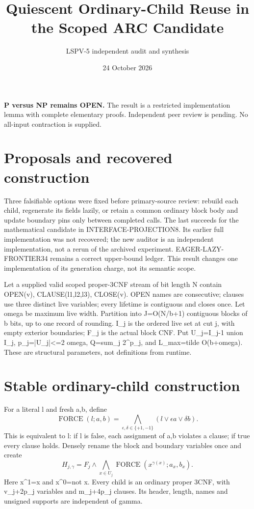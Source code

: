 \documentclass[11pt]{article}
\title{Quiescent Ordinary-Child Reuse in the Scoped ARC Candidate}
\author{LSPV-5 independent audit and synthesis}
\date{24 October 2026}
\begin{document}
\maketitle
\noindent\textbf{P versus NP remains OPEN.} The result is a restricted implementation lemma with complete elementary proofs. Independent peer review is pending. No all-input contraction is supplied.

\section{Proposals and recovered construction}
Three falsifiable options were fixed before primary-source review: rebuild each child, regenerate its fields lazily, or retain a common ordinary block body and update boundary pins only between completed calls. The last succeeds for the mathematical candidate in INTERFACE-PROJECTION8. Its earlier full implementation was not recovered; the new auditor is an independent implementation, not a rerun of the archived experiment. EAGER-LAZY-FRONTIER34 remains a correct upper-bound ledger. This result changes one implementation of its generation charge, not its semantic scope.

Let a supplied valid scoped proper-3CNF stream of bit length N contain OPEN(v), CLAUSE(l1,l2,l3), CLOSE(v). OPEN names are consecutive; clauses use three distinct live variables; every lifetime is contiguous and closes once. Let omega be maximum live width. Partition into J=O(N/b+1) contiguous blocks of b bits, up to one record of rounding. I_j is the ordered live set at cut j, with empty exterior boundaries; F_j is the actual block CNF. Put U_j=I_{j-1} union I_j, p_j=|U_j|<=2 omega, Q=sum_j 2^{p_j}, and L_max=tilde O(b+omega). These are structural parameters, not definitions from runtime.

\section{Stable ordinary-child construction}
For a literal l and fresh a,b, define
\[
\operatorname{FORCE}(l;a,b)=\bigwedge_{\epsilon,\delta\in\{+1,-1\}}
(l\vee\epsilon a\vee\delta b).
\]
This is equivalent to l: if l is false, each assignment of a,b violates a clause; if true every clause holds. Densely rename the block and boundary variables once and create
\[
H_{j,\gamma}=F_j\wedge\bigwedge_{x\in U_j}
\operatorname{FORCE}(x^{\gamma(x)};a_x,b_x).
\tag{1}
\]
Here x^1=x and x^0=not x. Every child is an ordinary proper 3CNF, with v_j+2p_j variables and m_j+4p_j clauses. Its header, length, names and unsigned supports are independent of gamma.
\end{document}
